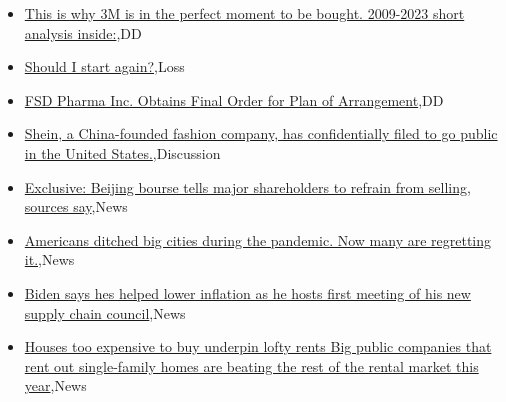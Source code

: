 \documentclass{article}%
\begin{document}
%
\begin{itemize}%
\item%
\href{https://reddit.com/r/wallstreetbets/comments/185v5rg/this\_is\_why\_3m\_is\_in\_the\_perfect\_moment\_to\_be/}{This is why 3M is in the perfect moment to be bought. 2009-2023 short analysis inside:},DD%
\item%
\href{https://reddit.com/r/wallstreetbets/comments/185totq/should\_i\_start\_again/}{Should I start again?},Loss%
\item%
\href{https://reddit.com/r/Baystreetbets/comments/1853opl/fsd\_pharma\_inc\_obtains\_final\_order\_for\_plan\_of/}{FSD Pharma Inc. Obtains Final Order for Plan of Arrangement},DD%
\item%
\href{https://reddit.com/r/StockMarket/comments/185jbh8/shein\_a\_chinafounded\_fashion\_company\_has/}{Shein, a China-founded fashion company, has confidentially filed to go public in the United States.},Discussion%
\item%
\href{https://reddit.com/r/StockMarket/comments/1851gdc/exclusive\_beijing\_bourse\_tells\_major\_shareholders/}{Exclusive: Beijing bourse tells major shareholders to refrain from selling, sources say},News%
\item%
\href{https://reddit.com/r/Economics/comments/185npjc/americans\_ditched\_big\_cities\_during\_the\_pandemic/}{Americans ditched big cities during the pandemic. Now many are regretting it.},News%
\item%
\href{https://reddit.com/r/Economics/comments/185kg6t/biden\_says\_hes\_helped\_lower\_inflation\_as\_he\_hosts/}{Biden says hes helped lower inflation as he hosts first meeting of his new supply chain council},News%
\item%
\href{https://reddit.com/r/Economics/comments/185fj6x/houses\_too\_expensive\_to\_buy\_underpin\_lofty\_rents/}{Houses too expensive to buy underpin lofty rents  Big public companies that rent out single-family homes are beating the rest of the rental market this year},News%
\end{itemize}%
\end{document}
